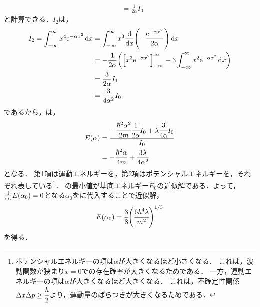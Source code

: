 \documentclass{report}
\begin{document}
\begin{myex}{}{}
\begin{align}
      &= \frac{1}{2\alpha} I_0\label{E1-I1}
    \end{align}
    と計算できる．$I_2$は，
    \begin{align}
      I_2 = \int_{-\infty}^{\infty}x^4\mathrm{e}^{-\alpha x^2} \dd{x} &= \int_{-\infty}^{\infty}x^3\dv{x}\qty(-\frac{\mathrm{e}^{-\alpha x^2}}{2\alpha}) \dd{x} \\ 
      &= -\frac{1}{2\alpha}\qty(\qty[x^3\mathrm{e}^{-\alpha x^2}]_{-\infty}^{\infty} - 3\int_{-\infty}^{\infty}x^2\mathrm{e}^{-\alpha x^2}\dd{x}) \\ 
      &= \frac{3}{2\alpha}I_1 \\ 
      &= \frac{3}{4\alpha^2}I_0
    \end{align}
    であるから，は，
    \begin{align}
      E(\alpha) &= \frac{-\cfrac{\hbar^2\alpha^2}{2m}\cfrac{1}{2\alpha}I_0 + \lambda\cfrac{3}{4\alpha} I_0}{I_0} \\ 
      &= -\frac{\hbar^2\alpha}{4m} + \frac{3\lambda}{4\alpha^2}
    \end{align}
    となる．
    第1項は運動エネルギーを，第2項はポテンシャルエネルギーを，それぞれ表している\footnote{
      ポテンシャルエネルギーの項は$\alpha$が大きくなるほど小さくなる．
      これは，波動関数が狭まり$x=0$での存在確率が大きくなるためである．
      一方，運動エネルギーの項は$\alpha$が大きくなるほど大きくなる．
      これは，不確定性関係$\Delta x\Delta p \geq \cfrac{\hbar}{2}$より，運動量のばらつきが大きくなるためである．
    }．
    の最小値が基底エネルギー$E_0$の近似解である．よって，$\dv{\alpha}E(\alpha_0) = 0$となる$\alpha_0$をに代入することで近似解，
    \begin{align}
      E(\alpha_0) = \cfrac{3}{8}\qty(\cfrac{6\hbar^4\lambda}{m^2})^{1/3}
    \end{align}
    を得る．
  \end{myex}
\end{document}
